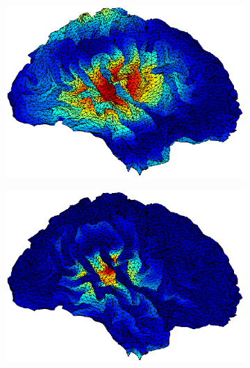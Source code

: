 \documentclass[doc,a4paper,12pt]{apa6}
\begin{document}
\begin{figure}
\begin{subfigure}[c]{0.47\textwidth}
    \label{img:pa07:aktiv:raw-mne}
  \end{subfigure}\vspace*{0.04\textwidth}
  \begin{subfigure}[c]{0.47\textwidth}
    \includegraphics[width=\textwidth]{ergebnisse/activity/pa07_eve2_sss_lcmv_activity_right.eps}
    \label{img:pa07:aktiv:sss-lcmv}
  \end{subfigure}\hspace*{0.04\textwidth}
  \begin{subfigure}[c]{0.47\textwidth}
    \includegraphics[width=\textwidth]{ergebnisse/activity/pa07_eve2_sss_mne_activity_right.eps}

\end{subfigure}
\end{figure}
\end{document}
